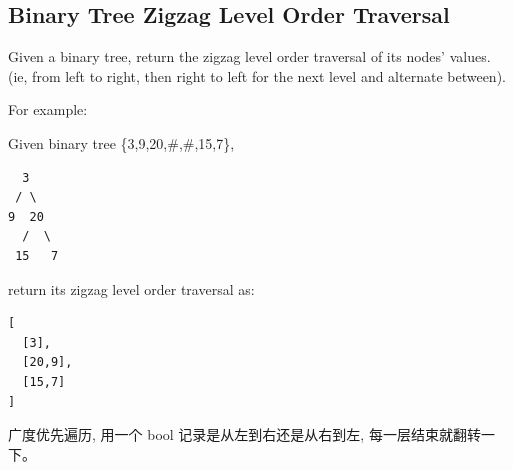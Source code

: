 \documentclass[12pt]{book}
\begin{document}
\subsection{Binary Tree Zigzag Level Order Traversal}
\label{sec-4-2-6}
Given a binary tree, return the zigzag level order traversal of its nodes' values. (ie, from left to right, then right to left for the next level and alternate between).

For example:

Given binary tree \{3,9,20,\#,\#,15,7\},
\lstset{language=java,label= ,caption= ,numbers=none}
\begin{lstlisting}
  3
 / \
9  20
  /  \
 15   7
\end{lstlisting}
return its zigzag level order traversal as:
\lstset{language=java,label= ,caption= ,numbers=none}
\begin{lstlisting}
[
  [3],
  [20,9],
  [15,7]
]
\end{lstlisting}

广度优先遍历, 用一个 bool 记录是从左到右还是从右到左, 每一层结束就翻转一
下。
\end{document}

